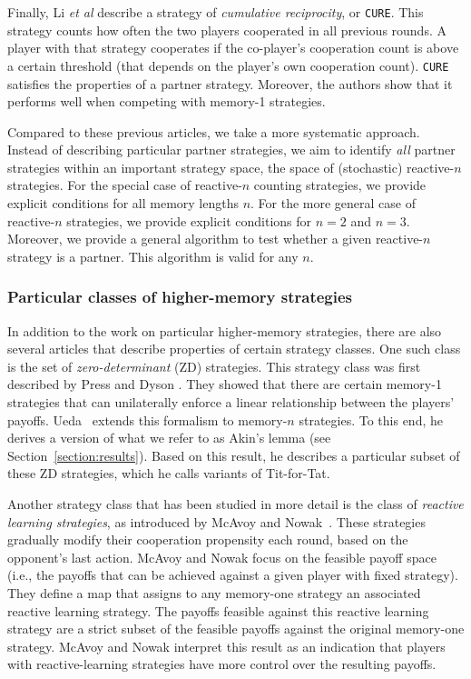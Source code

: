 \documentclass[9pt,twoside,lineno]{pnas-new}
\theoremstyle{plainCl1}
\theoremstyle{plainCl2}
\def\cure{\texttt{CURE}}
\begin{document}
Finally, Li {\it et al} \cite{li:NatureCompSci:2022} describe a strategy of {\it cumulative reciprocity}, or \cure. 
This strategy counts how often the two players cooperated in all previous rounds. 
A player with that strategy cooperates if the co-player's cooperation count is above a certain threshold (that depends on the player's own cooperation count). 
\cure{} satisfies the properties of a partner strategy. 
Moreover, the authors show that it performs well when competing with memory-1 strategies. 

Compared to these previous articles, we take a more systematic approach. 
Instead of describing particular partner strategies, we aim to identify {\it all} partner strategies within an important strategy space, the space of (stochastic) reactive-$n$ strategies. 
For the special case of reactive-$n$ counting strategies, we provide explicit conditions for all memory lengths $n$. 
For the more general case of reactive-$n$ strategies, we provide explicit conditions for $n\!=\!2$ and $n\!=\!3$. 
Moreover, we provide a general algorithm to test whether a given reactive-$n$ strategy is a partner. 
This algorithm is valid for any $n$. 

\subsubsection*{Particular classes of higher-memory strategies}
In addition to the work on particular higher-memory strategies, there are also several articles that describe properties of certain strategy classes. One such class is the set of {\it zero-determinant} (ZD) strategies. 
This strategy class was first described by Press and Dyson \cite{press:PNAS:2012}. 
They showed that there are certain memory-1 strategies that can unilaterally enforce a linear relationship between the players' payoffs. 
Ueda~\cite{ueda:RSOP:2021, Ueda:ORF:2022} extends this formalism to memory-$n$ strategies. 
To this end, he derives a version of what we refer to as Akin's lemma (see Section~\ref{section:results}). 
Based on this result, he describes a particular subset of these ZD strategies, which he calls variants of Tit-for-Tat. 

Another strategy class that has been studied in more detail is the class of {\it reactive learning strategies}, as introduced by McAvoy and Nowak~\cite{mcavoy:PRSA:2019}.
These strategies gradually modify their cooperation propensity each round, based on the opponent's last action. 
McAvoy and Nowak focus on the feasible payoff space (i.e., the payoffs that can be achieved against a given player with fixed strategy). 
They define a map that assigns to any memory-one strategy an associated reactive learning strategy. 
The payoffs feasible against this reactive learning strategy are a strict subset of the feasible payoffs against the original memory-one strategy. 
McAvoy and Nowak interpret this result as an indication that players with reactive-learning strategies have more control over the resulting payoffs. 
\end{document}
